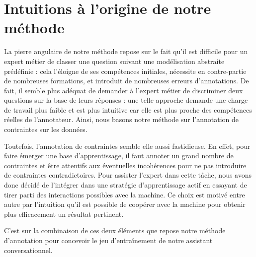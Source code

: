     \minitoc


    \section{Intuitions à l'origine de notre méthode}
    \label{section:3.1-DESCRIPTION-INTUITIONS}

		La pierre angulaire de notre méthode repose sur le fait qu'il est difficile pour un expert métier de classer une question suivant une modélisation abstraite prédéfinie :
		cela l'éloigne de ses compétences initiales, nécessite en contre-partie de nombreuses formations, et introduit de nombreuses erreurs d'annotations.
		De fait, il semble plus adéquat de demander à l'expert métier de discriminer deux questions sur la base de leurs réponses :
		une telle approche demande une charge de travail plus faible et est plus intuitive car elle est plus proche des compétences réelles de l'annotateur.
		Ainsi, nous basons notre méthode sur l'annotation de contraintes sur les données.
		
		Toutefois, l'annotation de contraintes semble elle aussi fastidieuse.
		En effet, pour faire émerger une base d'apprentissage, il faut annoter un grand nombre de contraintes et être attentifs aux éventuelles incohérences pour ne pas introduire de contraintes contradictoires.
		Pour assister l'expert dans cette tâche, nous avons donc décidé de l'intégrer dans une stratégie d'apprentissage actif en essayant de tirer parti des interactions possibles avec la machine. Ce choix est motivé entre autre par l'intuition qu'il est possible de coopérer avec la machine pour obtenir plus efficacement un résultat pertinent.

		C'est sur la combinaison de ces deux éléments que repose notre méthode d'annotation pour concevoir le jeu d’entraînement de notre assistant conversationnel.


